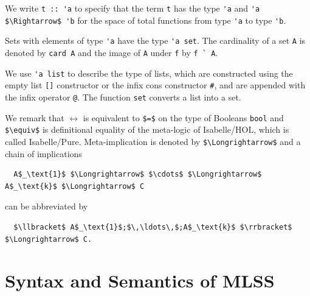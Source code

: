 \documentclass[
  sigplan,
  10pt,
  ]{acmart}
\begin{document}
We write \lstinline!t :: 'a! to specify that the term \lstinline!t! has the type \lstinline!'a! and \lstinline!'a $\Rightarrow$ 'b! for the space of total functions from type \lstinline!'a! to type \lstinline!'b!.

Sets with elements of type \lstinline!'a! have the type \lstinline!'a set!.
The cardinality of a set \lstinline!A! is denoted by \lstinline!card A! and the image of \lstinline!A! under \lstinline!f! by \lstinline!f ` A!.

We use \lstinline!'a list! to describe the type of lists, which are constructed using the empty list \lstinline![]! constructor or the infix cons constructor \lstinline!#!, and are appended with the infix operator \lstinline!@!.
The function \lstinline!set! converts a list into a set.

We remark that $\longleftrightarrow$ is equivalent to \lstinline!$=$! on the type of Booleans \lstinline!bool! and \lstinline!$\equiv$! is definitional equality of the meta-logic of Isabelle/HOL, which is called Isabelle/Pure.
Meta-implication is denoted by \lstinline!$\Longrightarrow$! and a chain of implications
\begin{lstlisting}
  A$_\text{1}$ $\Longrightarrow$ $\cdots$ $\Longrightarrow$ A$_\text{k}$ $\Longrightarrow$ C
\end{lstlisting}
can be abbreviated by 
\begin{lstlisting}
  $\llbracket$ A$_\text{1}$;$\,\ldots\,$;A$_\text{k}$ $\rrbracket$ $\Longrightarrow$ C.
\end{lstlisting}

\section{Syntax and Semantics of MLSS\label{sec:semantics}}
\end{document}

